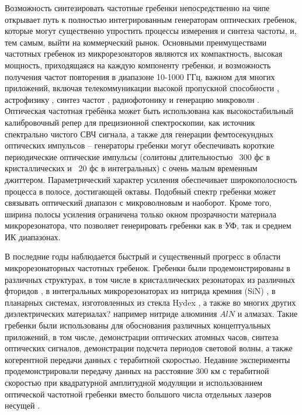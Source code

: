 Возможность синтезировать частотные гребенки непосредственно на чипе открывает путь к полностью интегрированным генераторам оптических гребенок, которые могут существенно упростить процессы измерения и синтеза частоты, и, тем самым, выйти на коммерческий рынок. Основными преимуществами частотных гребенок из микрорезонаторов являются их компактность, высокая мощность, приходящаяся на каждую компоненту гребенки, и возможность получения частот повторения в диапазоне 10-1000 ГГц, важном для многих приложений, включая телекоммуникации высокой пропускной способности \cite{Pfeifle2014}, астрофизику \cite{Glenday2015}, синтез частот \cite{Ferdous2011}, радиофотонику и генерацию микроволн \cite{Xue2016,Savchenkov2008}. Оптическая частотная гребёнка может быть использована как высокостабильный калибровочный репер для прецизионной спектроскопии, как источник спектрально чистого СВЧ сигнала, а также для генерации фемтосекундных оптических импульсов – генераторы гребенки могут обеспечивать короткие периодические оптические импульсы (солитоны длительностью ~300 фс в кристаллических и ~20 фс в интегральных) с очень малым временным джиттером. Параметрический характер усиления обеспечивает широкополосность процесса в полосе, достигающей октавы. Подобный спектр гребенки может связывать оптический диапазон с микроволновым и наоборот. Кроме того, ширина полосы усиления ограничена только окном прозрачности материала микрорезонатора, что позволяет генерировать гребенки как в УФ, так и среднем ИК диапазонах.


В последние годы наблюдается быстрый и существенный прогресс в области микрорезонаторных частотных гребенок. Гребенки были продемонстрированы в различных структурах, в том числе в кристаллических резонаторах из различных фторидов \cite{Savchenkov2008,Grudinin2012,Jost2015,Liang2011,DelHaye2011,Chembo2010,Grudinin2009}, в интегральных микрорезонаторах из нитрида кремния (SiN) \cite{Levy2010,Okawachi2011,Johnson2012,Huang2015}, в планарных системах, изготовленных из стекла Hydex \cite{Moss2013,Razzari2010}, а также во многих других диэлектрических материалах? например нитриде алюминия  $AlN$ и алмазах\cite{Jung2013,Hausmann2014}. Такие гребенки были использованы для обоснования различных концептуальных приложений, в том числе, демонстрации оптических атомных часов, синтеза оптических сигналов, демонстрации подсчета периодов световой волны, а также когерентной передачи данных с терабитной скоростью. Недавние эксперименты продемонстрировали передачу данных на расстояние 300 км с терабитной скоростью при квадратурной амплитудной модуляции и использованием оптической частотной гребенки вместо большого числа отдельных лазеров несущей \cite{Pfeifle2014}.


